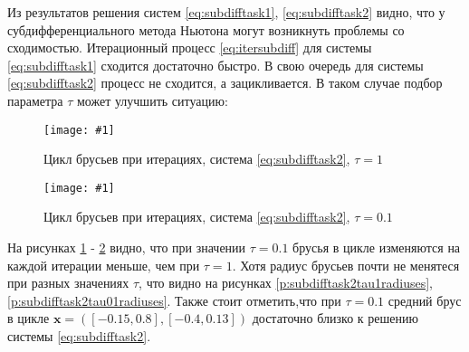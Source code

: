 \documentclass[a4paper,12pt]{article}
\newcommand{\plot}[3]{
    \begin{figure}[H]
        \texttt{[image: \#1]}
        \caption{#2}
        \label{#3}
    \end{figure}
}
\begin{document}
    \noindent
    Из результатов решения систем \ref{eq:subdifftask1}, \ref{eq:subdifftask2} видно, что у субдифференциального метода Ньютона могут возникнуть проблемы со сходимостью.
    Итерационный процесс \ref{eq:itersubdiff} для системы \ref{eq:subdifftask1} сходится достаточно быстро.
    В свою очередь для системы \ref{eq:subdifftask2} процесс не сходится, а зацикливается.
    В таком случае подбор параметра $ \tau $ может улучшить ситуацию:
    \plot{SubdifferentialNewtonTask2Tau1Cyrcle}{Цикл брусьев при итерациях, система \ref{eq:subdifftask2}, $ \tau = 1 $}{p:subdifftask2tau1cyrcle}
    \plot{SubdifferentialNewtonTask2Tau01Cyrcle}{Цикл брусьев при итерациях, система \ref{eq:subdifftask2}, $ \tau = 0.1 $}{p:subdifftask2tau01cyrcle}
    На рисунках \ref{p:subdifftask2tau1cyrcle} - \ref{p:subdifftask2tau01cyrcle} видно, что при значении $ \tau = 0.1 $ брусья в цикле изменяются на каждой итерации меньше, чем при $ \tau = 1 $.
    Хотя радиус брусьев почти не менятеся при разных значениях $ \tau $, что видно на рисунках \ref{p:subdifftask2tau1radiuses}, \ref{p:subdifftask2tau01radiuses}.
    Также стоит отметить,что при $ \tau = 0.1 $ средний брус в цикле $ \textbf{x} = ([-0.15, 0.8], [-0.4, 0.13]) $ достаточно близко к решению системы \ref{eq:subdifftask2}. \newline
\end{document}

